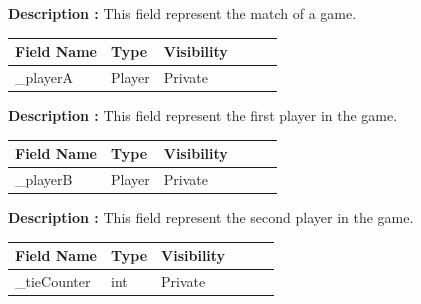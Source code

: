 \documentclass[12pt]{article}
\begin{document}
    \textbf{Description :} This field represent the match of a game.

    \begin{table}[H]
        \begin{tabular}{llllll}
            \hline
            \multicolumn{1}{|l|}{\cellcolor[HTML]{EFEFEF}\textbf{Field Name}} & \multicolumn{1}{l|}{\cellcolor[HTML]{EFEFEF}\textbf{Type}} & \multicolumn{1}{l|}{\cellcolor[HTML]{EFEFEF}\textbf{Visibility}} \\ \hline
            \multicolumn{1}{|l|}{\_playerA}                                   & \multicolumn{1}{l|}{Player}                                & \multicolumn{1}{l|}{Private}                                     \\ \hline
        \end{tabular}
    \end{table}

    \textbf{Description :} This field represent the first player in the game.

    \begin{table}[H]
        \begin{tabular}{llllll}
            \hline
            \multicolumn{1}{|l|}{\cellcolor[HTML]{EFEFEF}\textbf{Field Name}} & \multicolumn{1}{l|}{\cellcolor[HTML]{EFEFEF}\textbf{Type}} & \multicolumn{1}{l|}{\cellcolor[HTML]{EFEFEF}\textbf{Visibility}} \\ \hline
            \multicolumn{1}{|l|}{\_playerB}                                   & \multicolumn{1}{l|}{Player}                                & \multicolumn{1}{l|}{Private}                                     \\ \hline
        \end{tabular}
    \end{table}

    \textbf{Description :} This field represent the second player in the game.

    \begin{table}[H]
        \begin{tabular}{llllll}
            \hline
            \multicolumn{1}{|l|}{\cellcolor[HTML]{EFEFEF}\textbf{Field Name}} & \multicolumn{1}{l|}{\cellcolor[HTML]{EFEFEF}\textbf{Type}} & \multicolumn{1}{l|}{\cellcolor[HTML]{EFEFEF}\textbf{Visibility}} \\ \hline
            \multicolumn{1}{|l|}{\_tieCounter}                                & \multicolumn{1}{l|}{int}                                   & \multicolumn{1}{l|}{Private}                                     \\ \hline
        \end{tabular}
    \end{table}
\end{document}

